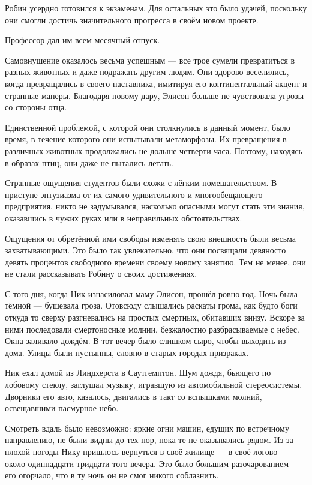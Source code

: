 \documentclass[a4paper,12pt]{book}
\begin{document}
\par
Робин усердно готовился к экзаменам. Для остальных это было удачей, поскольку они смогли достичь значительного прогресса в своём новом проекте.
\par
Профессор дал им всем месячный отпуск.
\par
Самовнушение оказалось весьма успешным — все трое сумели превратиться в разных животных и даже подражать другим людям. Они здорово веселились, когда  превращались в своего наставника, имитируя его континентальный акцент и странные манеры. Благодаря новому дару, Элисон больше не чувствовала угрозы со стороны отца.
\par
Единственной проблемой, с которой они столкнулись в данный момент, было время, в течение которого они испытывали метаморфозы. Их превращения в различных животных продолжались не дольше четверти часа. Поэтому, находясь в образах птиц, они даже не пытались летать.
\par
Странные ощущения студентов были схожи с лёгким помешательством. В приступе энтузиазма от их самого удивительного и многообещающего предприятия, никто не задумывался, насколько опасными могут стать эти знания, оказавшись в чужих руках или в неправильных обстоятельствах.
\par
Ощущения от обретённой ими свободы изменять свою внешность были весьма захватывающими. Это было так увлекательно, что они посвящали девяносто девять процентов свободного времени своему новому занятию. Тем не менее, они не стали рассказывать Робину о своих достижениях.\\
\par
С того дня, когда Ник изнасиловал маму Элисон, прошёл ровно год. Ночь была тёмной — бушевала гроза. Отовсюду слышались раскаты грома, как будто боги откуда то сверху разгневались на простых смертных, обитавших внизу. Вскоре за ними последовали смертоносные молнии, безжалостно разбрасываемые с небес. Окна заливало дождём. В тот вечер было слишком сыро, чтобы выходить из дома. Улицы были пустынны, словно в старых городах-призраках.
\par
Ник ехал домой из Линдхерста в Саутгемптон. Шум дождя, бьющего по лобовому стеклу, заглушал музыку, игравшую из автомобильной стереосистемы. Дворники его авто, казалось, двигались в такт со вспышками молний, освещавшими пасмурное небо.
\par
Смотреть вдаль было невозможно: яркие огни машин, едущих по встречному направлению, не были видны до тех пор, пока те не оказывались рядом. Из-за плохой погоды Нику пришлось вернуться в своё жилище — в своё логово — около одиннадцати-тридцати того вечера. Это было большим разочарованием — его огорчало, что в ту ночь он не смог никого соблазнить.
\end{document}
